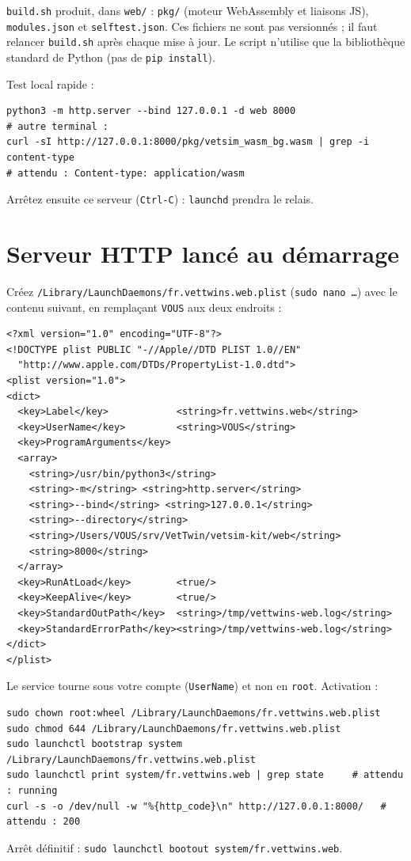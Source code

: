 \documentclass[11pt,a4paper]{article}
\newcommand{\cmd}[1]{\texttt{#1}}
\newcommand{\aremplacer}[1]{\textcolor{red!60!black}{\texttt{#1}}}
\begin{document}
\cmd{build.sh} produit, dans \cmd{web/} : \cmd{pkg/} (moteur WebAssembly et liaisons JS), \cmd{modules.json} et \cmd{selftest.json}. Ces fichiers ne sont pas versionnés ; il faut relancer \cmd{build.sh} après chaque mise à jour. Le script n'utilise que la bibliothèque standard de Python (pas de \cmd{pip install}).

Test local rapide :
\begin{Verbatim}
python3 -m http.server --bind 127.0.0.1 -d web 8000
# autre terminal :
curl -sI http://127.0.0.1:8000/pkg/vetsim_wasm_bg.wasm | grep -i content-type
# attendu : Content-type: application/wasm
\end{Verbatim}
Arrêtez ensuite ce serveur (\cmd{Ctrl-C}) : \cmd{launchd} prendra le relais.

\section{Serveur HTTP lancé au démarrage}
Créez \cmd{/Library/LaunchDaemons/fr.vettwins.web.plist} (\cmd{sudo nano \ldots}) avec le contenu suivant, en remplaçant \aremplacer{VOUS} aux deux endroits :
\begin{Verbatim}
<?xml version="1.0" encoding="UTF-8"?>
<!DOCTYPE plist PUBLIC "-//Apple//DTD PLIST 1.0//EN"
  "http://www.apple.com/DTDs/PropertyList-1.0.dtd">
<plist version="1.0">
<dict>
  <key>Label</key>            <string>fr.vettwins.web</string>
  <key>UserName</key>         <string>VOUS</string>
  <key>ProgramArguments</key>
  <array>
    <string>/usr/bin/python3</string>
    <string>-m</string> <string>http.server</string>
    <string>--bind</string> <string>127.0.0.1</string>
    <string>--directory</string>
    <string>/Users/VOUS/srv/VetTwin/vetsim-kit/web</string>
    <string>8000</string>
  </array>
  <key>RunAtLoad</key>        <true/>
  <key>KeepAlive</key>        <true/>
  <key>StandardOutPath</key>  <string>/tmp/vettwins-web.log</string>
  <key>StandardErrorPath</key><string>/tmp/vettwins-web.log</string>
</dict>
</plist>
\end{Verbatim}
Le service tourne sous votre compte (\cmd{UserName}) et non en \cmd{root}. Activation :
\begin{Verbatim}
sudo chown root:wheel /Library/LaunchDaemons/fr.vettwins.web.plist
sudo chmod 644 /Library/LaunchDaemons/fr.vettwins.web.plist
sudo launchctl bootstrap system /Library/LaunchDaemons/fr.vettwins.web.plist
sudo launchctl print system/fr.vettwins.web | grep state     # attendu : running
curl -s -o /dev/null -w "%{http_code}\n" http://127.0.0.1:8000/   # attendu : 200
\end{Verbatim}
Arrêt définitif : \cmd{sudo launchctl bootout system/fr.vettwins.web}.
\end{document}
